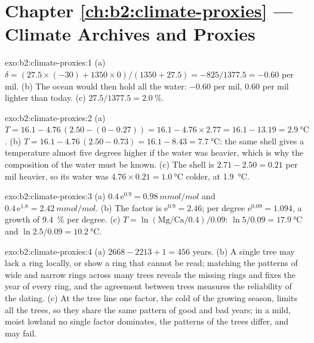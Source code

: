 \section*{Chapter \ref{ch:b2:climate-proxies} --- Climate Archives and Proxies}

\begin{solution}{exo:b2:climate-proxies:1}
(a) $\delta = (27.5 \times (-30) + 1350 \times 0)/(1350 + 27.5) = -825/1377.5 = -0.60$ per mil.
(b) The ocean would then hold all the water: $-0.60$ per mil, \num{0.60} per mil lighter than
today. (c) $27.5/1377.5 = \qty{2.0}{\percent}$.
\end{solution}

\begin{solution}{exo:b2:climate-proxies:2}
(a) $T = 16.1 - 4.76\,(2.50 - (0 - 0.27)) = 16.1 - 4.76 \times 2.77 = 16.1 - 13.19 =
\qty{2.9}{\celsius}$. (b) $T = 16.1 - 4.76\,(2.50 - 0.73) = 16.1 - 8.43 = \qty{7.7}{\celsius}$: the
same shell gives a temperature almost five degrees higher if the water was heavier, which is why
the composition of the water must be known. (c) The shell is $2.71 - 2.50 = 0.21$ per mil heavier,
so its water was $4.76 \times 0.21 = \qty{1.0}{\celsius}$ colder, at \qty{1.9}{\celsius}.
\end{solution}

\begin{solution}{exo:b2:climate-proxies:3}
(a) $0.4\,\mathrm{e}^{0.9} = \qty{0.98}{mmol/mol}$ and $0.4\,\mathrm{e}^{1.8} =
\qty{2.42}{mmol/mol}$. (b) The factor is $\mathrm{e}^{0.9} = 2.46$; per degree $\mathrm{e}^{0.09}
= 1.094$, a growth of \qty{9.4}{\percent} per degree. (c) $T = \ln(\text{Mg/Ca}/0.4)/0.09$:
$\ln 5/0.09 = \qty{17.9}{\celsius}$ and $\ln 2.5/0.09 = \qty{10.2}{\celsius}$.
\end{solution}

\begin{solution}{exo:b2:climate-proxies:4}
(a) $2668 - 2213 + 1 = 456$ years. (b) A single tree may lack a ring locally, or show a ring
that cannot be read; matching the patterns of wide and narrow rings across many trees reveals the
missing rings and fixes the year of every ring, and the agreement between trees measures the
reliability of the dating. (c) At the tree line one factor, the cold of the growing season,
limits all the trees, so they share the same pattern of good and bad years; in a mild, moist
lowland no single factor dominates, the patterns of the trees differ, and  may fail.
\end{solution}

